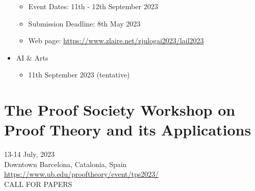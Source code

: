 \documentclass[prodmode,acmtecs]{acmsmall} %
\begin{document}
\begin{itemize}
\begin{itemize}\item  Event Dates: 11th - 12th September 2023
\item  Submission Deadline: 8th May 2023
\item  Web page: \href{https://www.zlaire.net/zjulogai2023/lail2023}{https://www.zlaire.net/zjulogai2023/lail2023}
\end{itemize} 
\item   AI \& Arts 
 
\begin{itemize}\item  11th September 2023 (tentative)
\end{itemize} 
\end{itemize}\section{The Proof Society Workshop on Proof Theory and its Applications}\label{TheProofSocietyWorkshoponProofTheoryanditsApplications}  13-14 July, 2023\\ 
  Downtown Barcelona, Catalonia, Spain\\ 
  \href{https://www.ub.edu/prooftheory/event/tps2023/}{https://www.ub.edu/prooftheory/event/tps2023/}\\ 
CALL FOR PAPERS 
\end{document}
